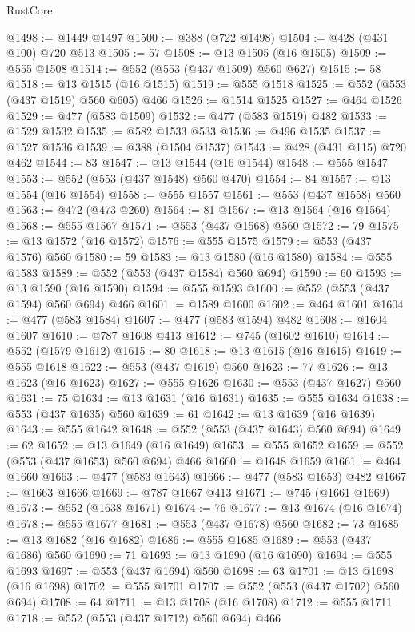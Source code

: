 \begin{lexlean}{RustCore}
\begin{coremodule}
@1498 := @1449 @1497
@1500 := @388 (@722 @1498)
@1504 := @428 (@431 @100) @720 @513
@1505 := 57
@1508 := @13 @1505 (@16 @1505)
@1509 := @555 @1508
@1514 := @552 (@553 (@437 @1509) @560 @627)
@1515 := 58
@1518 := @13 @1515 (@16 @1515)
@1519 := @555 @1518
@1525 := @552 (@553 (@437 @1519) @560 @605) @466
@1526 := @1514 @1525
@1527 := @464 @1526
@1529 := @477 (@583 @1509)
@1532 := @477 (@583 @1519) @482
@1533 := @1529 @1532
@1535 := @582 @1533 @533
@1536 := @496 @1535
@1537 := @1527 @1536
@1539 := @388 (@1504 @1537)
@1543 := @428 (@431 @115) @720 @462
@1544 := 83
@1547 := @13 @1544 (@16 @1544)
@1548 := @555 @1547
@1553 := @552 (@553 (@437 @1548) @560 @470)
@1554 := 84
@1557 := @13 @1554 (@16 @1554)
@1558 := @555 @1557
@1561 := @553 (@437 @1558) @560
@1563 := @472 (@473 @260)
@1564 := 81
@1567 := @13 @1564 (@16 @1564)
@1568 := @555 @1567
@1571 := @553 (@437 @1568) @560
@1572 := 79
@1575 := @13 @1572 (@16 @1572)
@1576 := @555 @1575
@1579 := @553 (@437 @1576) @560
@1580 := 59
@1583 := @13 @1580 (@16 @1580)
@1584 := @555 @1583
@1589 := @552 (@553 (@437 @1584) @560 @694)
@1590 := 60
@1593 := @13 @1590 (@16 @1590)
@1594 := @555 @1593
@1600 := @552 (@553 (@437 @1594) @560 @694) @466
@1601 := @1589 @1600
@1602 := @464 @1601
@1604 := @477 (@583 @1584)
@1607 := @477 (@583 @1594) @482
@1608 := @1604 @1607
@1610 := @787 @1608 @413
@1612 := @745 (@1602 @1610)
@1614 := @552 (@1579 @1612)
@1615 := 80
@1618 := @13 @1615 (@16 @1615)
@1619 := @555 @1618
@1622 := @553 (@437 @1619) @560
@1623 := 77
@1626 := @13 @1623 (@16 @1623)
@1627 := @555 @1626
@1630 := @553 (@437 @1627) @560
@1631 := 75
@1634 := @13 @1631 (@16 @1631)
@1635 := @555 @1634
@1638 := @553 (@437 @1635) @560
@1639 := 61
@1642 := @13 @1639 (@16 @1639)
@1643 := @555 @1642
@1648 := @552 (@553 (@437 @1643) @560 @694)
@1649 := 62
@1652 := @13 @1649 (@16 @1649)
@1653 := @555 @1652
@1659 := @552 (@553 (@437 @1653) @560 @694) @466
@1660 := @1648 @1659
@1661 := @464 @1660
@1663 := @477 (@583 @1643)
@1666 := @477 (@583 @1653) @482
@1667 := @1663 @1666
@1669 := @787 @1667 @413
@1671 := @745 (@1661 @1669)
@1673 := @552 (@1638 @1671)
@1674 := 76
@1677 := @13 @1674 (@16 @1674)
@1678 := @555 @1677
@1681 := @553 (@437 @1678) @560
@1682 := 73
@1685 := @13 @1682 (@16 @1682)
@1686 := @555 @1685
@1689 := @553 (@437 @1686) @560
@1690 := 71
@1693 := @13 @1690 (@16 @1690)
@1694 := @555 @1693
@1697 := @553 (@437 @1694) @560
@1698 := 63
@1701 := @13 @1698 (@16 @1698)
@1702 := @555 @1701
@1707 := @552 (@553 (@437 @1702) @560 @694)
@1708 := 64
@1711 := @13 @1708 (@16 @1708)
@1712 := @555 @1711
@1718 := @552 (@553 (@437 @1712) @560 @694) @466

\end{coremodule}
\end{lexlean}
